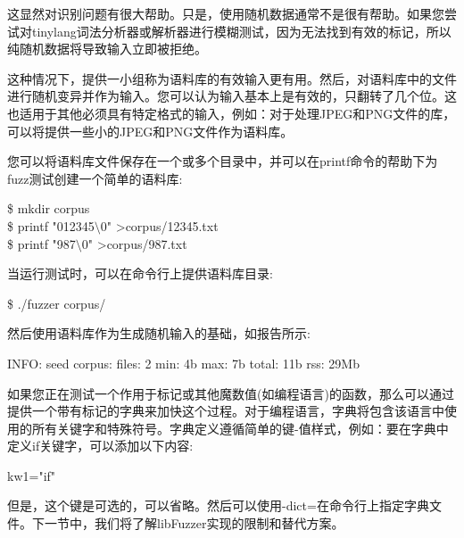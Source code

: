 这显然对识别问题有很大帮助。只是，使用随机数据通常不是很有帮助。如果您尝试对tinylang词法分析器或解析器进行模糊测试，因为无法找到有效的标记，所以纯随机数据将导致输入立即被拒绝。\par

这种情况下，提供一小组称为语料库的有效输入更有用。然后，对语料库中的文件进行随机变异并作为输入。您可以认为输入基本上是有效的，只翻转了几个位。这也适用于其他必须具有特定格式的输入，例如：对于处理JPEG和PNG文件的库，可以将提供一些小的JPEG和PNG文件作为语料库。\par

您可以将语料库文件保存在一个或多个目录中，并可以在printf命令的帮助下为fuzz测试创建一个简单的语料库:\par

\begin{tcolorbox}[colback=white,colframe=black]
\$ mkdir corpus \\
\$ printf "012345$\setminus$0" >corpus/12345.txt \\
\$ printf "987$\setminus$0" >corpus/987.txt
\end{tcolorbox}

当运行测试时，可以在命令行上提供语料库目录:\par

\begin{tcolorbox}[colback=white,colframe=black]
\$ ./fuzzer corpus/
\end{tcolorbox}

然后使用语料库作为生成随机输入的基础，如报告所示:\par

\begin{tcolorbox}[colback=white,colframe=black]
INFO: seed corpus: files: 2 min: 4b max: 7b total: 11b rss: 29Mb
\end{tcolorbox}

如果您正在测试一个作用于标记或其他魔数值(如编程语言)的函数，那么可以通过提供一个带有标记的字典来加快这个过程。对于编程语言，字典将包含该语言中使用的所有关键字和特殊符号。字典定义遵循简单的键-值样式，例如：要在字典中定义if关键字，可以添加以下内容:\par

\begin{tcolorbox}[colback=white,colframe=black]
kw1="if"
\end{tcolorbox}

但是，这个键是可选的，可以省略。然后可以使用-dict=在命令行上指定字典文件。下一节中，我们将了解libFuzzer实现的限制和替代方案。\par

